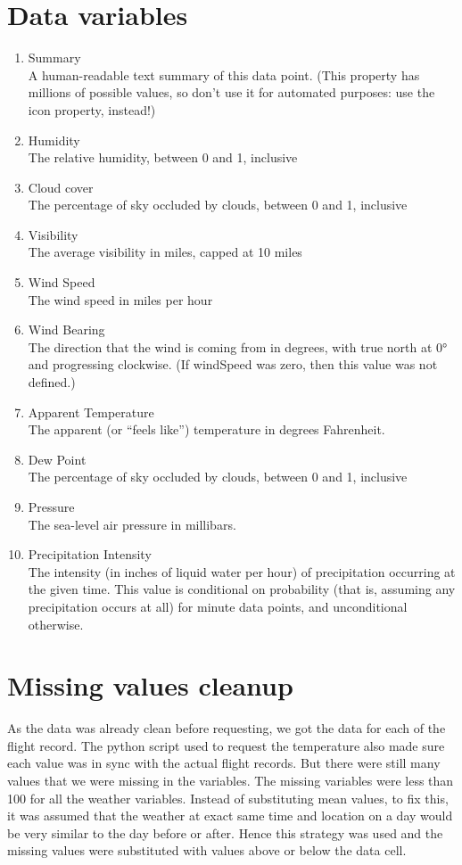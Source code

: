 \section{Data variables}
\begin{enumerate}
    \item Summary
    \\A human-readable text summary of this data point. (This property has millions of possible values, so don’t use it for automated purposes: use the icon property, instead!)
    \item Humidity
    \\The relative humidity, between 0 and 1, inclusive
    \item Cloud cover
    \\The percentage of sky occluded by clouds, between 0 and 1, inclusive
    \item Visibility
    \\The average visibility in miles, capped at 10 miles
    \item Wind Speed
    \\The wind speed in miles per hour
    \item Wind Bearing
    \\The direction that the wind is coming from in degrees, with true north at 0° and progressing clockwise. (If windSpeed was zero, then this value was not defined.)
    \item Apparent Temperature
    \\The apparent (or “feels like”) temperature in degrees Fahrenheit.
    \item Dew Point
    \\The percentage of sky occluded by clouds, between 0 and 1, inclusive
    \item Pressure
    \\The sea-level air pressure in millibars.
    \item Precipitation Intensity
    \\The intensity (in inches of liquid water per hour) of precipitation occurring at the given time. This value is conditional on probability (that is, assuming any precipitation occurs at all) for minute data points, and unconditional otherwise.
\end{enumerate}

\section{Missing values cleanup}
As the data was already clean before requesting, we got the data for each of the flight record. The python script used to request the temperature also made sure each value was in sync with the actual flight records.
But there were still many values that we were missing in the variables. The missing variables were less than 100 for all the weather variables. Instead of substituting mean values, to fix this, it was assumed that the weather at exact same time and location on a day would be very similar to the day before or after. Hence this strategy was used and the missing values were substituted with values above or below the data cell. 

